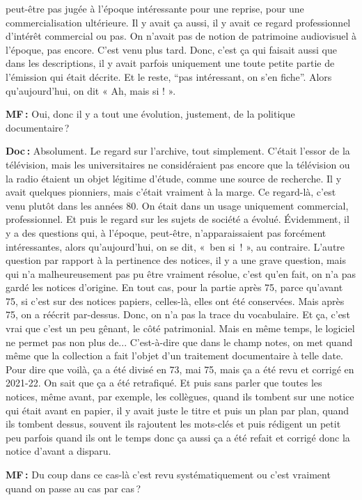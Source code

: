 peut-être pas jugée à l’époque intéressante pour une reprise, pour une commercialisation ultérieure. Il y avait ça aussi, il y avait ce regard professionnel d'intérêt commercial ou pas. On n'avait pas de notion de patrimoine audiovisuel à l'époque, pas encore. C'est venu plus tard. Donc, c'est ça qui faisait aussi que dans les descriptions, il y avait parfois uniquement une toute petite partie de l'émission qui était décrite.  Et le reste, “pas intéressant, on s'en fiche”. Alors qu'aujourd'hui, on dit « Ah, mais si ! ».

\textbf{MF :} Oui, donc il y a tout une évolution, justement, de la politique documentaire ? 

\textbf{Doc :} Absolument.  Le regard sur l'archive, tout simplement. C'était l’essor de la télévision, mais les universitaires ne considéraient pas encore que la télévision ou la radio étaient un objet légitime d’étude, comme une source de recherche. Il y avait quelques pionniers, mais c'était vraiment à la marge. Ce regard-là, c'est venu plutôt dans les années 80. On était dans un usage uniquement commercial, professionnel. Et puis le regard sur les sujets de société a évolué.  Évidemment, il y a des questions qui, à l'époque, peut-être, n'apparaissaient pas forcément intéressantes, alors qu'aujourd'hui, on se dit, « ben si ! », au contraire. L'autre question par rapport à la pertinence des notices, il y a une grave question, mais qui n'a malheureusement pas pu être vraiment résolue, c'est qu'en fait, on n'a pas gardé les notices d'origine. En tout cas, pour la partie après 75, parce qu'avant 75, si c'est sur des notices papiers, celles-là, elles ont été conservées. Mais après 75, on a réécrit par-dessus. Donc, on n'a pas la trace du vocabulaire. Et ça, c'est vrai que c'est un peu gênant, le côté patrimonial. Mais en même temps, le logiciel ne permet pas non plus de...  C'est-à-dire que dans le champ notes, on met quand même que la collection a fait l'objet d'un traitement documentaire à telle date.  Pour dire que voilà, ça a été divisé en 73, mai 75, mais ça a été revu et corrigé en 2021-22. On sait que ça a été retrafiqué. Et puis sans parler que toutes les notices, même avant, par exemple, les collègues, quand ils tombent sur une notice qui était avant en papier, il y avait juste le titre et puis un plan par plan, quand ils tombent dessus, souvent ils rajoutent les mots-clés et puis rédigent un petit peu parfois quand ils ont le temps donc ça aussi ça a été refait et corrigé donc la notice d'avant a disparu. 

\textbf{MF :} Du coup dans ce cas-là c'est revu systématiquement ou c'est vraiment quand on passe au cas par cas ? 

